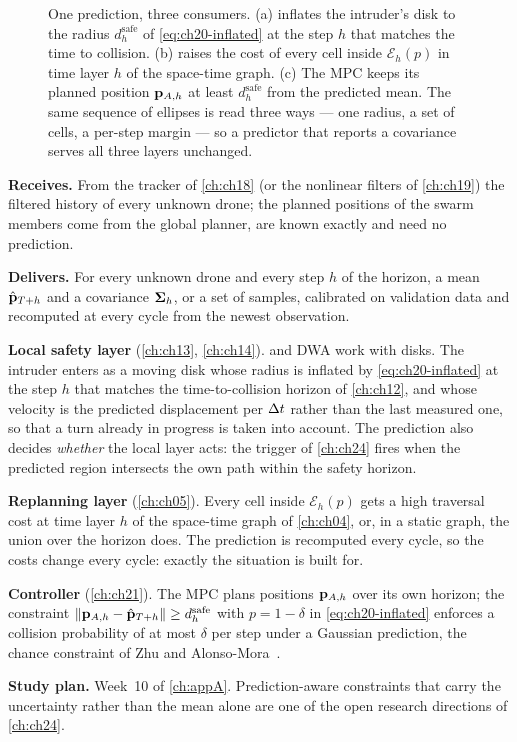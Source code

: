 \begin{figure}[tb]
  \centering
  \caption{One prediction, three consumers. (a) \orca inflates the intruder's
  disk to the radius $d^{\mathrm{safe}}_h$ of \cref{eq:ch20-inflated} at the
  step $h$ that matches the time to collision. (b) \dstarlite raises the cost
  of every cell inside $\mathcal{E}_h(p)$ in time layer $h$ of the space-time
  graph. (c) The MPC keeps its planned position $\mathbf{p}_{A,h}$ at least
  $d^{\mathrm{safe}}_h$ from the predicted mean. The same sequence of ellipses
  is read three ways --- one radius, a set of cells, a per-step margin --- so
  a predictor that reports a covariance serves all three layers unchanged.}
  \label{fig:ch20-integration}
\end{figure}

\begin{dronebox}
\textbf{Receives.} From the tracker of \cref{ch:ch18} (or the nonlinear
filters of \cref{ch:ch19}) the filtered history of every unknown drone; the
planned positions of the swarm members come from the global planner, are
known exactly and need no prediction.

\textbf{Delivers.} For every unknown drone and every step $h$ of the
horizon, a mean $\hat{\mathbf{p}}_{T+h}$ and a covariance $\mathbf{\Sigma}_h$, or a set
of samples, calibrated on validation data and recomputed at every cycle from
the newest observation.

\textbf{Local safety layer} (\cref{ch:ch13}, \cref{ch:ch14}). \orca and DWA
work with disks. The intruder enters as a moving disk whose radius is inflated
by \cref{eq:ch20-inflated} at the step $h$ that matches the time-to-collision
horizon of \cref{ch:ch12}, and whose velocity is the predicted displacement
per $\Delta t$ rather than the last measured one, so that a turn already in
progress is taken into account. The prediction also decides \emph{whether} the
local layer acts: the trigger of \cref{ch:ch24} fires when the predicted
region intersects the own path within the safety horizon.

\textbf{Replanning layer} (\cref{ch:ch05}). Every cell inside
$\mathcal{E}_h(p)$ gets a high traversal cost at time layer $h$ of the
space-time graph of \cref{ch:ch04}, or, in a static graph, the union over the
horizon does. The prediction is recomputed every cycle, so the costs change
every cycle: exactly the situation \dstarlite is built for.

\textbf{Controller} (\cref{ch:ch21}). The MPC plans positions $\mathbf{p}_{A,h}$
over its own horizon; the constraint $\left\lVert \mathbf{p}_{A,h} - \hat{\mathbf{p}}_{T+h} \right\rVert \ge
d^{\mathrm{safe}}_h$ with $p = 1 - \delta$ in \cref{eq:ch20-inflated} enforces a collision
probability of at most $\delta$ per step under a Gaussian prediction, the
chance constraint of Zhu and Alonso-Mora~\cite{zhu2019chance}.

\textbf{Study plan.} Week~10 of \cref{ch:appA}. Prediction-aware constraints that carry the uncertainty rather than the mean
alone are one of the open research directions of \cref{ch:ch24}.
\end{dronebox}

